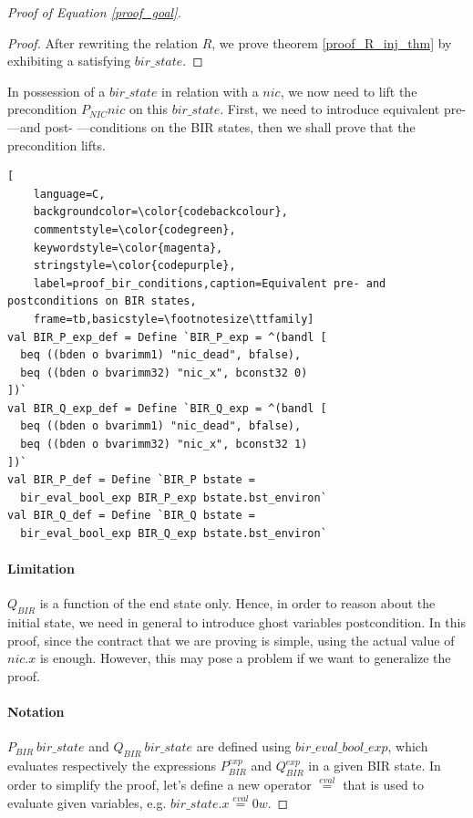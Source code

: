 \documentclass{kththesis}
\newcommand{\eqeval}{\stackrel{eval}{=}}
\begin{document}
{\begin{proof}[Proof of Equation \ref{proof_goal}]
\begin{proof}
After rewriting the relation $R$, we prove theorem \ref{proof_R_inj_thm} by exhibiting a satisfying $bir\_state$.
\end{proof}

In possession of a $bir\_state$ in relation with a $nic$, we now need to lift the precondition $P_{NIC} nic$ on this $bir\_state$. First, we need to introduce equivalent pre- ---and post- ---conditions on the BIR states, then we shall prove that the precondition lifts.

\begin{lstlisting}[
    language=C,
    backgroundcolor=\color{codebackcolour},
    commentstyle=\color{codegreen},
    keywordstyle=\color{magenta},
    stringstyle=\color{codepurple},
    label=proof_bir_conditions,caption=Equivalent pre- and postconditions on BIR states,
    frame=tb,basicstyle=\footnotesize\ttfamily]
val BIR_P_exp_def = Define `BIR_P_exp = ^(bandl [
  beq ((bden o bvarimm1) "nic_dead", bfalse),
  beq ((bden o bvarimm32) "nic_x", bconst32 0)
])`
val BIR_Q_exp_def = Define `BIR_Q_exp = ^(bandl [
  beq ((bden o bvarimm1) "nic_dead", bfalse),
  beq ((bden o bvarimm32) "nic_x", bconst32 1)
])`
val BIR_P_def = Define `BIR_P bstate =
  bir_eval_bool_exp BIR_P_exp bstate.bst_environ`
val BIR_Q_def = Define `BIR_Q bstate =
  bir_eval_bool_exp BIR_Q_exp bstate.bst_environ`
\end{lstlisting}

\paragraph{Limitation} $Q_{BIR}$ is a function of the end state only. Hence, in order to reason about the initial state, we need in general to introduce ghost variables postcondition. In this proof, since the contract that we are proving is simple, using the actual value of $nic.x$ is enough. However, this may pose a problem if we want to generalize the proof.

\paragraph{Notation} $P_{BIR}~bir\_state$ and $Q_{BIR}~bir\_state$ are defined using $bir\_eval\_bool\_exp$, which evaluates respectively the expressions $P^{exp}_{BIR}$ and $Q^{exp}_{BIR}$ in a given BIR state. In order to simplify the proof, let's define a new operator $\eqeval$ that is used to evaluate given variables, e.g. $bir\_state.x \eqeval 0w$.
\bigskip


\end{proof}}
\end{document}
